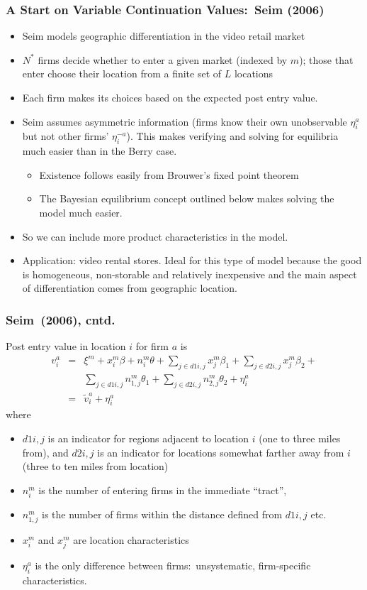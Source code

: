\documentclass[aspectratio=169,11pt]{beamer}
\begin{document}
\begin{frame}\frametitle{A Start on Variable Continuation Values:\ Seim (2006)}
\footnotesize
\begin{itemize}
\item Seim models geographic differentiation in the video retail market
\item $N^{\ast }$ firms decide whether to enter a given market (indexed by $%
m $); those that enter choose their location from a finite set of $L$
locations
\item Each firm makes its choices based on the expected post entry value.
\item Seim assumes asymmetric information (firms know their own unobservable 
$\eta _{i}^{a}$ but not other firms' $\eta _{i}^{-a}$). This makes verifying
and solving for equilibria much easier than in the Berry case.
\begin{itemize}
\item Existence follows easily from Brouwer's fixed point theorem
\item The Bayesian equilibrium concept outlined below makes solving the
model much easier.
\end{itemize}
\item So we can include more product characteristics in the model.
\item Application: video rental stores. Ideal for this type of model because
the good is homogeneous, non-storable and relatively inexpensive and the
main aspect of differentiation comes from geographic location.
\end{itemize}
\end{frame}

\begin{frame}\frametitle{Seim\ (2006), cntd.}
\footnotesize
Post entry value in location $i$ for firm $a$ is 
\begin{eqnarray*}
v_{i}^{a} &=&\xi ^{m}+x_{i}^{m}\beta +n_{i}^{m}\theta +\sum_{j\in
d1i,j}x_{j}^{m}\beta _{1}+\sum_{j\in d2i,j}x_{j}^{m}\beta _{2}+ \\
&&\sum_{j\in d1i,j}n_{1,j}^{m}\theta _{1}+\sum_{j\in d2i,j}n_{2,j}^{m}\theta
_{2}+\eta _{i}^{a} \\
&=&\tilde{v}_{i}^{a}+\eta _{i}^{a}
\end{eqnarray*}
where
\begin{itemize}
\item $d1i,j$ is an indicator for regions adjacent to location $i$ (one to
three miles from), and $d2i,j$ is an indicator for locations somewhat
farther away from $i$ (three to ten miles from location)
\item $n_{i}^{m}$ is the number of entering firms in the immediate
\textquotedblleft tract\textquotedblright ,
\item $n_{1,j}^{m}$ is the number of firms within the distance defined from $%
d1i,j$ etc.
\item $x_{i}^{m}$ and $x_{j}^{m}$ are location characteristics
\item $\eta _{i}^{a}$ is the only difference between firms:\ unsystematic,
firm-specific characteristics.
\end{itemize}
\end{frame}
\end{document}
